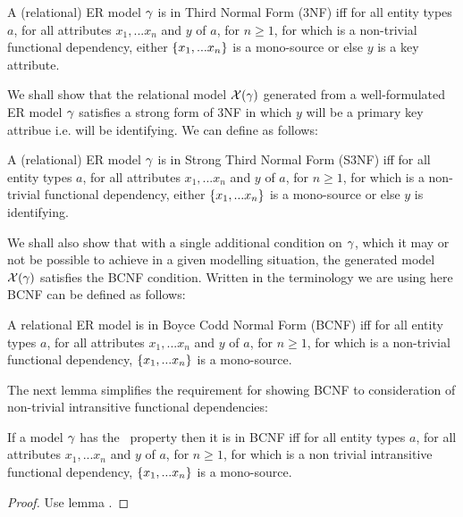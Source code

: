 \begin{definition} %
A (relational) ER model $\gamma$ is in  Third Normal Form (3NF)  iff
for all entity types $a$, for all attributes $x_1,...x_n$ and $y$ of $a$, for $n \geq 1$, 
for which   is a non-trivial functional dependency, 
either $\left\{x_1,...x_n\right\}$ is a mono-source or else $y$ is a key attribute.
\end{definition}


We shall show that the relational model $\mathcal{X}(\gamma)$ generated from a well-formulated 
ER model $\gamma$ satisfies a strong form of 3NF in which $y$ will be a primary key attribue i.e. will be identifying.
We can define as follows:

\begin{definition} %
A (relational) ER model $\gamma$ is in Strong Third Normal Form (S3NF)  iff
for all entity types $a$, for all attributes $x_1,...x_n$ and $y$ of $a$, for $n \geq 1$, 
for which   is a non-trivial functional dependency, 
either $\left\{x_1,...x_n\right\}$ is a mono-source or else $y$ is identifying.
\end{definition}

We shall also show that with a single additional condition on $\gamma$, which it may or not be possible to achieve in a given modelling situation,
the generated model $\mathcal{X}(\gamma)$ satisfies the BCNF condition.
Written in the terminology we are using here BCNF can be defined as follows:
\begin{definition} %
A relational ER model is in Boyce Codd Normal Form (BCNF)  iff
for all entity types $a$, for all attributes $x_1,...x_n$ and $y$ of $a$, for $n \geq 1$, 
for which   is a non-trivial functional dependency, 
$\left\{x_1,...x_n\right\}$ is a mono-source.  
\end{definition}

\noindent The next lemma simplifies the requirement for showing BCNF to consideration of non-trivial
intransitive functional dependencies:

\begin{lemma}
If a model $\gamma$ has the \fdfactoring\ property then it is in BCNF iff
for all entity types $a$, for all attributes $x_1,...x_n$ and $y$ of $a$, for $n \geq 1$, 
for which  is a non trivial  intransitive functional dependency,
$\left\{x_1,...x_n\right\}$ is a mono-source. 
\end{lemma}
\begin{proof}Use lemma .
\end{proof}

